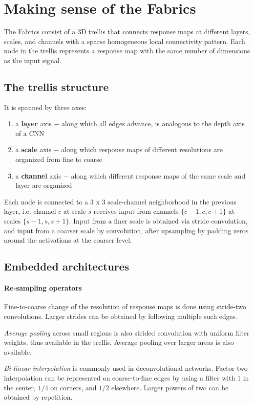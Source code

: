\documentclass[a4paper,twocolumn]{article}
\begin{document}
\section{Making sense of the Fabrics}
The Fabrics consist of a 3D trellis that connects response maps at different layers, scales, and channels with a sparse homogeneous local connectivity pattern.
Each node in the trellis represents a response map with the same number of dimensions as the input signal.

\subsection{The trellis structure}
It is spanned by three axes:
\begin{enumerate}
    \item a \textbf{layer} axis $-$ along which all edges advance, is analogous to the depth axis of a CNN
    \item a \textbf{scale} axis $-$ along which response maps of different resolutions are organized from fine to coarse
    \item a \textbf{channel} axis $-$ along which different response maps of the same scale and layer are organized
\end{enumerate}

Each node is connected to a 3 x 3 scale-channel neighborhood in the previous layer, i.e. channel $c$ at scale $s$ receives input from channels $\{c-1, c, c+1\}$ at scales $\{s-1, s, s+1\}$. Input from a finer scale is obtained via stride convolution, and input from a coarser scale by convolution, after upsampling by padding zeros around the activations at the coarser level.

\subsection{Embedded architectures}
\paragraph{Re-sampling operators}
Fine-to-coarse change of the resolution of response maps is done using stride-two convolutions. Larger strides can be obtained by following multiple such edges.

\textit{Average pooling} across small regions is also strided convolution with uniform filter weights, thus available in the trellis. Average pooling over larger areas is also available.

\textit{Bi-linear interpolation} is commonly used in deconvolutional networks. Factor-two interpolation can be represented on coarse-to-fine edges by using a filter with $1$ in the center, $1/4$ on corners, and $1/2$ elsewhere. Larger powers of two can be obtained by repetition.
\end{document}
